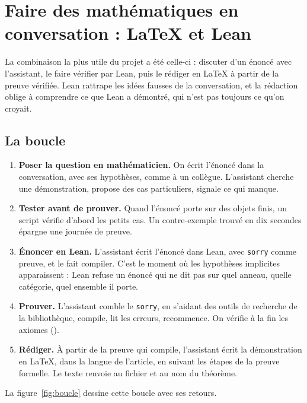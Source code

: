 \chapter{Faire des mathématiques en conversation : LaTeX et Lean}

La combinaison la plus utile du projet a été celle-ci : discuter d'un énoncé avec
l'assistant, le faire vérifier par Lean, puis le rédiger en LaTeX à partir de la preuve
vérifiée. Lean rattrape les idées fausses de la conversation, et la rédaction oblige à
comprendre ce que Lean a démontré, qui n'est pas toujours ce qu'on croyait.

\section{La boucle}

\begin{enumerate}
  \item \textbf{Poser la question en mathématicien.} On écrit l'énoncé dans la
        conversation, avec ses hypothèses, comme à un collègue. L'assistant cherche une
        démonstration, propose des cas particuliers, signale ce qui manque.
  \item \textbf{Tester avant de prouver.} Quand l'énoncé porte sur des objets finis,
        un script vérifie d'abord les petits cas. Un contre-exemple trouvé en dix
        secondes épargne une journée de preuve.
  \item \textbf{Énoncer en Lean.} L'assistant écrit l'énoncé dans Lean, avec
        \texttt{sorry} comme preuve, et le fait compiler. C'est le moment où les
        hypothèses implicites apparaissent : Lean refuse un énoncé qui ne dit pas sur
        quel anneau, quelle catégorie, quel ensemble il porte.
  \item \textbf{Prouver.} L'assistant comble le \texttt{sorry}, en s'aidant des outils de
        recherche de la bibliothèque, compile, lit les erreurs, recommence. On vérifie à
        la fin les axiomes ().
  \item \textbf{Rédiger.} À partir de la preuve qui compile, l'assistant écrit la
        démonstration en LaTeX, dans la langue de l'article, en suivant les étapes de la
        preuve formelle. Le texte renvoie au fichier et au nom du théorème.
\end{enumerate}

La figure~\ref{fig:boucle} dessine cette boucle avec ses retours.



